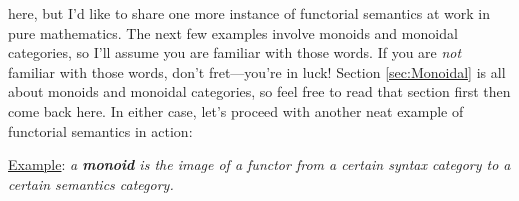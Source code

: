 \documentclass{tufte-handout-tai}
\newcommand{\cat}[1]{{\normalfont\textsf{#1}}}
\newcommand{\tai}[1]{{\color{magenta}#1}}
\theoremstyle{plain}
\theoremstyle{definition}
\theoremstyle{remark}
\begin{document}
 here, but I'd like to share one more instance of functorial semantics at work in pure mathematics. The next few examples involve monoids and monoidal categories, so I'll assume you are familiar with those words. If you are \textit{not} familiar with those words, don't fret---you're in luck! Section \ref{sec:Monoidal} is all about monoids and monoidal categories, so feel free to read that section first then come back here. In either case, let's proceed with another neat example of functorial semantics in action:

\vspace{0.5cm}
\noindent \underline{Example}: \textit{a \textbf{monoid} is the image of a functor from a certain syntax category to a certain semantics category.}
\vspace{0.5cm}
\end{document}
